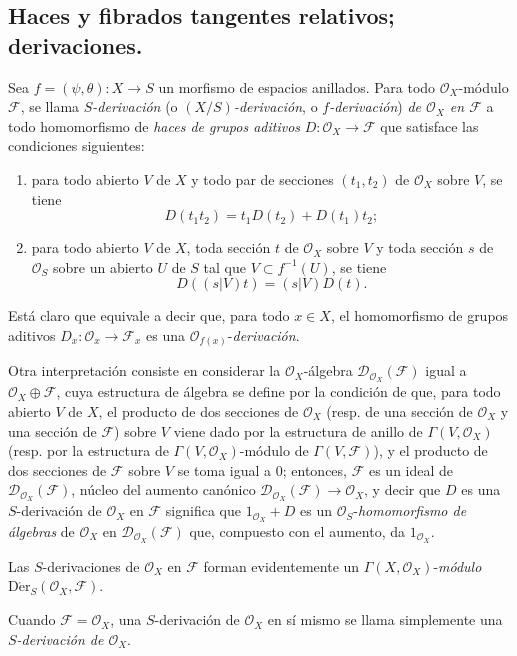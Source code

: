\subsection{Haces y fibrados tangentes relativos; derivaciones.}
\label{IV.16.5}

\begin{env}[16.5.1]
\label{IV.16.5.1}
Sea $f=(\psi,\theta):X\to S$ un morfismo de espacios anillados. Para todo
$\mathcal{O}_X$-módulo $\mathscr{F}$, se llama \emph{$S$-derivación}
(o \emph{$(X/S)$-derivación}, o \emph{$f$-derivación}) \emph{de
$\mathcal{O}_X$ en $\mathscr{F}$} a todo homomorfismo de \emph{haces de
grupos aditivos} $D:\mathcal{O}_X\to\mathscr{F}$ que satisface las condiciones
siguientes:
\begin{enumerate}
\item[\emph{a)}] para todo abierto $V$ de $X$ y todo par de secciones
$(t_1,t_2)$ de $\mathcal{O}_X$ sobre $V$, se tiene
\[
  D(t_1t_2)=t_1D(t_2)+D(t_1)t_2;
  \tag{16.5.1.1}
  \label{IV.16.5.1.1}
\]
\item[\emph{b)}] para todo abierto $V$ de $X$, toda sección $t$ de $\mathcal{O}_X$
sobre $V$ y toda sección $s$ de $\mathcal{O}_S$ sobre un abierto
$U$ de $S$ tal que $V\subset f^{-1}(U)$, se tiene
\[
  D((s|V)t)=(s|V)D(t).
  \tag{16.5.1.2}
  \label{IV.16.5.1.2}
\]
\end{enumerate}
Está claro que equivale a decir que, para todo $x\in X$,
el homomorfismo de grupos aditivos
$D_x:\mathcal{O}_x\to\mathscr{F}_x$ es una
$\mathcal{O}_{f(x)}$-\emph{derivación}.

Otra interpretación consiste en considerar la $\mathcal{O}_X$-álgebra
$\mathscr{D}_{\mathcal{O}_X}(\mathscr{F})$ igual a
$\mathcal{O}_X\oplus\mathscr{F}$, cuya estructura de álgebra se define por la
condición de que, para todo abierto $V$ de $X$, el producto de dos secciones de
$\mathcal{O}_X$ (resp. de una sección de $\mathcal{O}_X$ y una sección de
$\mathscr{F}$) sobre $V$ viene dado por la estructura de anillo de
$\Gamma(V,\mathcal{O}_X)$ (resp. por la estructura de
$\Gamma(V,\mathcal{O}_X)$-módulo de $\Gamma(V,\mathscr{F})$), y el producto de
dos secciones de $\mathscr{F}$ sobre $V$ se toma igual a 0; entonces,
$\mathscr{F}$ es un ideal de
$\mathscr{D}_{\mathcal{O}_X}(\mathscr{F})$, núcleo del aumento canónico
$\mathscr{D}_{\mathcal{O}_X}(\mathscr{F})\to\mathcal{O}_X$, y decir que $D$
es una $S$-derivación de $\mathcal{O}_X$ en $\mathscr{F}$ significa que
$1_{\mathcal{O}_X}+D$ es un $\mathcal{O}_S$-\emph{homomorfismo de álgebras} de
$\mathcal{O}_X$ en $\mathscr{D}_{\mathcal{O}_X}(\mathscr{F})$ que, compuesto
con el aumento, da $1_{\mathcal{O}_X}$.

Las $S$-derivaciones de $\mathcal{O}_X$ en $\mathscr{F}$ forman evidentemente
un $\Gamma(X,\mathcal{O}_X)$-\emph{módulo}
$\operatorname{D\acute{e}r}_S(\mathcal{O}_X,\mathscr{F})$.

Cuando $\mathscr{F}=\mathcal{O}_X$, una $S$-derivación de $\mathcal{O}_X$ en
sí mismo se llama simplemente una \emph{$S$-derivación de $\mathcal{O}_X$}.
\end{env}

